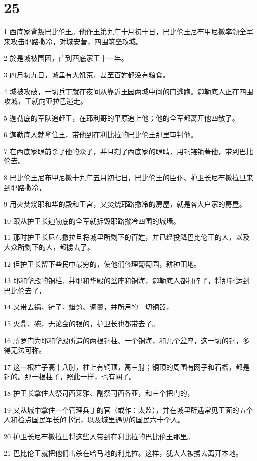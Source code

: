 \chapter{25}

\par 1 西底家背叛巴比伦王。他作王第九年十月初十日，巴比伦王尼布甲尼撒率领全军来攻击耶路撒冷，对城安营，四围筑垒攻城。
\par 2 於是城被围困，直到西底家王十一年。
\par 3 四月初九日，城里有大饥荒，甚至百姓都没有粮食。
\par 4 城被攻破，一切兵丁就在夜间从靠近王园两城中间的门逃跑。迦勒底人正在四围攻城，王就向亚拉巴逃走。
\par 5 迦勒底的军队追赶王，在耶利哥的平原追上他；他的全军都离开他四散了。
\par 6 迦勒底人就拿住王，带他到在利比拉的巴比伦王那里审判他。
\par 7 在西底家眼前杀了他的众子，并且剜了西底家的眼睛，用铜链锁著他，带到巴比伦去。
\par 8 巴比伦王尼布甲尼撒十九年五月初七日，巴比伦王的臣仆、护卫长尼布撒拉旦来到耶路撒冷，
\par 9 用火焚烧耶和华的殿和王宫，又焚烧耶路撒冷的房屋，就是各大户家的房屋。
\par 10 跟从护卫长迦勒底的全军就拆毁耶路撒冷四围的城墙。
\par 11 那时护卫长尼布撒拉旦将城里所剩下的百姓，并已经投降巴比伦王的人，以及大众所剩下的人，都掳去了。
\par 12 但护卫长留下些民中最穷的，使他们修理葡萄园，耕种田地。
\par 13 耶和华殿的铜柱，并耶和华殿的盆座和铜海，迦勒底人都打碎了，将那铜运到巴比伦去了，
\par 14 又带去锅、铲子、蜡剪、调羹，并所用的一切铜器，
\par 15 火鼎、碗，无论金的银的，护卫长也都带去了。
\par 16 所罗门为耶和华殿所造的两根铜柱、一个铜海，和几个盆座，这一切的铜，多得无法可称。
\par 17 这一根柱子高十八肘，柱上有铜顶，高三肘；铜顶的周围有网子和石榴，都是铜的。那一根柱子，照此一样，也有网子。
\par 18 护卫长拿住大祭司西莱雅、副祭司西番亚，和三个把门的，
\par 19 又从城中拿住一个管理兵丁的官（或作：太监），并在城里所遇常见王面的五个人和检点国民军长的书记，以及城里遇见的国民六十个人。
\par 20 护卫长尼布撒拉旦将这些人带到在利比拉的巴比伦王那里。
\par 21 巴比伦王就把他们击杀在哈马地的利比拉。这样，犹大人被掳去离开本地。
